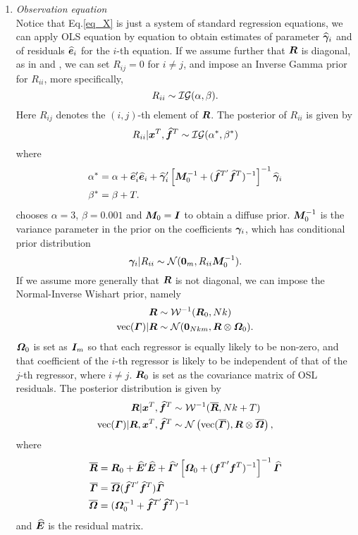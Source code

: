 \begin{enumerate}
\begin{enumerate}
\item
\textit{Observation equation}\\
Notice that Eq.\eqref{eq_X} is just a system of standard regression equations, we can apply OLS equation by equation to obtain estimates of parameter $\widehat{\bm \gamma}_i$ and of residuals $\widehat{\bm e}_i$ for the $i$-th equation. If we assume further that $\bm R$ is diagonal, as in \cite{FAVAR} and \cite{FAVAR_sign}, we can set $R_{ij}=0$ for $i\ne j$, and impose an Inverse Gamma prior for $R_{ii}$, more specifically,
\begin{equation}
	R_{ii}\sim\mathcal{I}\mathcal{G}(\alpha,\beta).
\end{equation}
Here $R_{ij}$ denotes the $(i,j)$-th element of $\bm R$. The posterior of $R_{ii}$ is given by
\begin{equation}
	R_{ii}|\bm x^T,\widehat{\bm f}^T\sim\mathcal{I}\mathcal{G}(\alpha^*,\beta^*)
\end{equation}
where
\begin{align}
	\alpha^*&=\alpha+\widehat{\bm e}_i'\widehat{\bm e}_i+\widehat{\bm \gamma}_i'\left[\bm M_0^{-1}+(\widehat{\bm f}^{T'}\widehat{\bm f}^T)^{-1}\right]^{-1}\widehat{\bm \gamma}_i\\
	\beta^*&=\beta+T.
\end{align}
\cite{FAVAR} chooses $\alpha=3$, $\beta=0.001$ and $\bm M_0=\bm I$ to obtain a diffuse prior. $\bm M_0^{-1}$ is the variance parameter in the prior on the coefficients $\bm \gamma_i$, which has conditional prior distribution
\begin{equation}
	\bm \gamma_i|R_{ii}\sim\mathcal{N}(\boldsymbol{0}_m,R_{ii}\bm M_0^{-1}).
\end{equation}
If we assume more generally that $\bm R$ is not diagonal, we can impose the Normal-Inverse Wishart prior, namely
\begin{align}
	\bm R&\sim\mathcal{W}^{-1}(\bm R_0,Nk)\\
	\operatorname{vec}(\bm \varGamma)|\bm R&\sim\mathcal{N}(\boldsymbol{0}_{Nkm},\bm R\otimes\bm \varOmega_0).
\end{align}
$\bm \varOmega_0$ is set as $\bm I_m$ so that each regressor is equally likely to be non-zero, and that coefficient of the $i$-th regressor is likely to be independent of that of the $j$-th regressor, where $i\ne j$. $\bm R_0$ is set as the covariance matrix of OSL residuals. The posterior distribution is given by
\begin{align}
	\bm R|\bm x^T,\widehat{\bm f}^T&\sim\mathcal{W}^{-1}(\overline{\bm R},Nk+T)\\
	\operatorname{vec}(\bm \varGamma)|\bm R,\bm x^T,\widehat{\bm f}^T&\sim\mathcal{N}\left(\operatorname{vec}(\overline{\bm \varGamma}),\bm R\otimes\overline{\bm \varOmega}\right),
\end{align}
where
\begin{align}
	\overline{\bm R}&=\bm R_0+\widehat{\bm E}'\widehat{\bm E}+\widehat{\bm \varGamma}'\left[\bm \varOmega_0+({\bm f^T}'\bm f^T)^{-1}\right]^{-1}\widehat{\bm \varGamma}\\
	\overline{\bm \varGamma}&=\overline{\bm \varOmega}(\widehat{\bm f}^{T'}\widehat{\bm f}^T)\widehat{\bm \varGamma}\\
	\overline{\bm \varOmega}&=(\bm \varOmega_0^{-1}+\widehat{\bm f}^{T'}\widehat{\bm f}^T)^{-1}
\end{align}
and $\widehat{\bm E}$ is the residual matrix.


\end{enumerate}
\end{enumerate}
